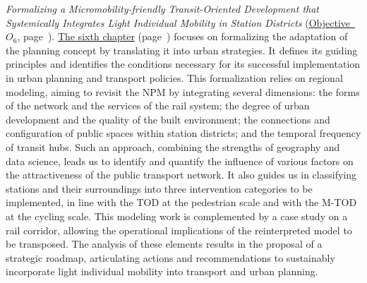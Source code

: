\textsl{Formalizing a Micromobility-friendly Transit-Oriented Development that Systemically Integrates Light Individual Mobility in Station Districts} (\hyperref[objectif-6]{Objective~\(O_6\)}, page~\pageref{objectif-6}). \hyperref[chap6:titre]{The sixth chapter} (page~\pageref{chap6:titre}) focuses on formalizing the adaptation of the planning concept by translating it into urban strategies. It defines its guiding principles and identifies the conditions necessary for its successful implementation in urban planning and transport policies. This formalization relies on regional modeling, aiming to revisit the \acrfull{NPM} by integrating several dimensions: the forms of the network and the services of the rail system; the degree of urban development and the quality of the built environment; the connections and configuration of public spaces within station districts; and the temporal frequency of transit hubs. Such an approach, combining the strengths of geography and data science, leads us to identify and quantify the influence of various factors on the attractiveness of the public transport network. It also guides us in classifying stations and their surroundings into three intervention categories to be implemented, in line with the \acrshort{TOD} at the pedestrian scale and with the \acrshort{M-TOD} at the cycling scale. This modeling work is complemented by a case study on a rail corridor, allowing the operational implications of the reinterpreted model to be transposed. The analysis of these elements results in the proposal of a strategic roadmap, articulating actions and recommendations to sustainably incorporate light individual mobility into transport and urban planning.%
